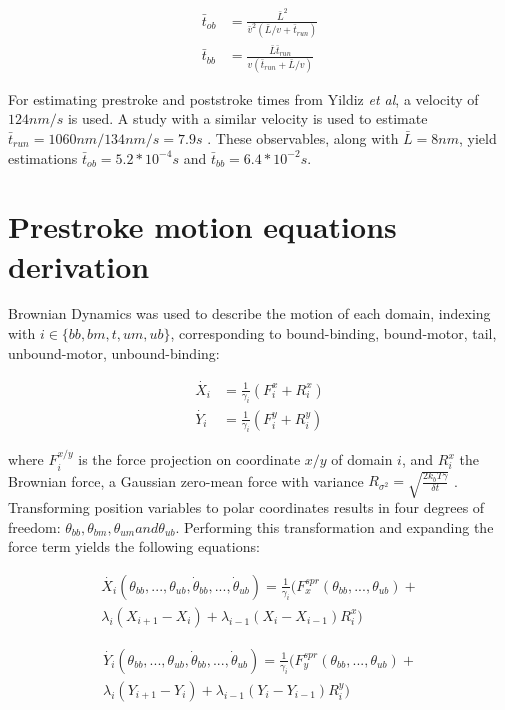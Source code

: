 \documentclass[9pt,twocolumn,twoside]{article}
\begin{document}
  \begin{align}
    \bar{t}_{ob} &= \frac{\bar{L}^2}{\bar{v}^2\left(\bar{L}/v+\bar{t}_{run}\right)}\\
    \bar{t}_{bb} &= \frac{\bar{L}\bar{t}_{run}}{v\left(\bar{t}_{run}+\bar{L}/v\right)}
  \end{align}

  For estimating prestroke and poststroke times from Yildiz \textit{et al}\cite{yildiz}, a velocity of $124 nm/s$ is used. A study with a similar velocity is used to estimate $\bar{t}_{run} = 1060 nm / 134 nm / s = 7.9s$ \cite{weihongpaper}. These observables, along with $\bar{L} = 8nm$, yield estimations $\bar{t}_{ob} = 5.2*10^{-4}s$ and $\bar{t}_{bb} = 6.4 * 10^{-2}s$.

\section*{Prestroke motion equations derivation}
Brownian Dynamics was used to describe the motion of each domain, indexing with $i \in \{bb, bm, t, um, ub\}$, corresponding to bound-binding, bound-motor, tail, unbound-motor, unbound-binding:

  \begin{align}
    \dot{X_i} &= \frac{1}{\gamma_i}\left(F^x_i + R^x_i\right)\\
    \dot{Y_i} &= \frac{1}{\gamma_i}\left(F^y_i + R^y_i\right)
  \end{align}

  where $F^{x/y}_i$ is the force projection on coordinate $x/y$ of domain $i$, and $R^x_i$ the Brownian force, a Gaussian zero-mean force with variance $R_{\sigma^2} = \sqrt{\frac{2k_bT\gamma}{\delta t}}$ \cite{einstein}. Transforming position variables to polar coordinates results in four degrees of freedom: $\theta_{bb}, \theta_{bm}, \theta_{um} and \theta_{ub}$. Performing this transformation and expanding the force term yields the following equations:

  \begin{multline}
    \dot{X_i}\left(\theta_{bb}, ..., \theta_{ub}, \dot{\theta}_{bb}, ..., \dot{\theta}_{ub}\right) = \frac{1}{\gamma_i}\big(F^{spr}_x(\theta_{bb}, ..., \theta_{ub}) + \\
    \lambda_i\left(X_{i+1}-X_i\right) + \lambda_{i-1}\left(X_i-X_{i-1}\right)R^x_i\big)
    \label{eq:ob-system}
  \end{multline}

  \begin{multline}
    \dot{Y_i}\left(\theta_{bb}, ..., \theta_{ub}, \dot{\theta}_{bb}, ..., \dot{\theta}_{ub}\right) = \frac{1}{\gamma_i}\big(F^{spr}_y(\theta_{bb}, ..., \theta_{ub}) + \\
    \lambda_i\left(Y_{i+1}-Y_i\right) + \lambda_{i-1}\left(Y_i-Y_{i-1}\right)R^y_i\big)
    \label{eq:ob-system-other}
  \end{multline}
\end{document}

